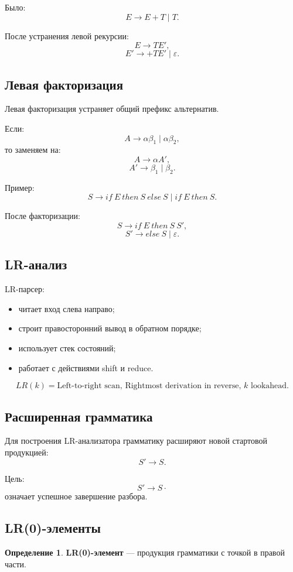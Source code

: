 \documentclass[12pt,a4paper]{article}
\theoremstyle{definition}
\newtheorem{definition}{Определение}
\theoremstyle{plain}
\begin{document}
Было:
\[
E\to E+T \mid T.
\]

После устранения левой рекурсии:
\[
E\to TE',
\]
\[
E'\to +TE' \mid \varepsilon.
\]

\subsection{Левая факторизация}

Левая факторизация устраняет общий префикс альтернатив.

Если:
\[
A\to \alpha\beta_1 \mid \alpha\beta_2,
\]
то заменяем на:
\[
A\to \alpha A',
\]
\[
A'\to \beta_1 \mid \beta_2.
\]

Пример:
\[
S\to if\ E\ then\ S\ else\ S \mid if\ E\ then\ S.
\]

После факторизации:
\[
S\to if\ E\ then\ S\ S',
\]
\[
S'\to else\ S \mid \varepsilon.
\]

\subsection{LR-анализ}

LR-парсер:
\begin{itemize}
    \item читает вход слева направо;
    \item строит правосторонний вывод в обратном порядке;
    \item использует стек состояний;
    \item работает с действиями shift и reduce.
\end{itemize}

\[
LR(k)=
\text{Left-to-right scan, Rightmost derivation in reverse, }k\text{ lookahead}.
\]

\subsection{Расширенная грамматика}

Для построения LR-анализатора грамматику расширяют новой стартовой продукцией:
\[
S'\to S.
\]

Цель:
\[
S'\to S\cdot
\]
означает успешное завершение разбора.

\subsection{LR(0)-элементы}

\begin{definition}
\textbf{LR(0)-элемент} --- продукция грамматики с точкой в правой части.
\end{definition}
\end{document}
